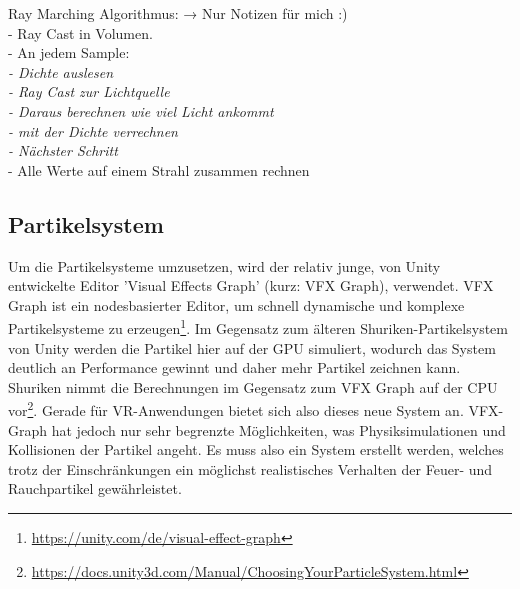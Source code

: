 Ray Marching Algorithmus:  → Nur Notizen für mich :)  \\
- Ray Cast in Volumen.\\
- An jedem Sample: \\ \textit{
	- Dichte auslesen\\
	- Ray Cast zur Lichtquelle\\
	- Daraus berechnen wie viel Licht ankommt\\
	- mit der Dichte verrechnen\\
	- Nächster Schritt\\
}
- Alle Werte auf einem Strahl zusammen rechnen\\

\subsection{Partikelsystem}
Um die Partikelsysteme umzusetzen, wird der relativ junge, von Unity entwickelte Editor 'Visual Effects Graph'
(kurz: VFX Graph), verwendet. VFX Graph ist ein nodesbasierter Editor, um schnell
dynamische und komplexe Partikelsysteme zu erzeugen\footnote{\url{https://unity.com/de/visual-effect-graph}}.
Im Gegensatz zum älteren Shuriken-Partikelsystem von Unity werden die Partikel hier auf der GPU
simuliert, wodurch das System deutlich an Performance gewinnt und daher mehr Partikel zeichnen kann.
Shuriken nimmt die Berechnungen im Gegensatz zum VFX Graph auf der CPU vor\footnote{\url{https://docs.unity3d.com/Manual/ChoosingYourParticleSystem.html}}.
Gerade für VR-Anwendungen bietet sich also dieses neue System an.
VFX-Graph hat jedoch nur sehr begrenzte Möglichkeiten, was Physiksimulationen und Kollisionen der Partikel angeht.
Es muss also ein System erstellt werden, welches trotz der Einschränkungen ein möglichst realistisches
Verhalten der Feuer- und Rauchpartikel gewährleistet.




\newpage
